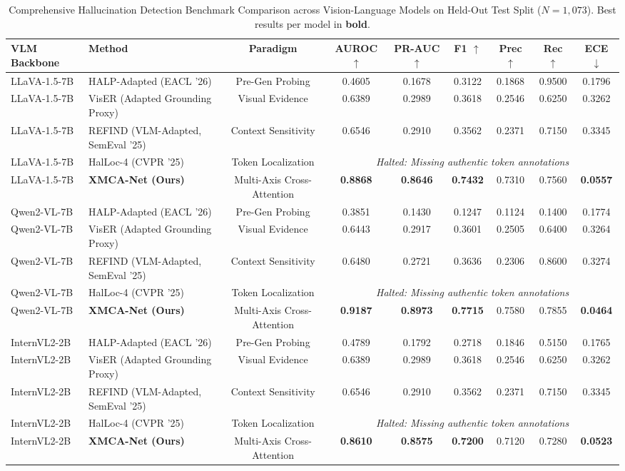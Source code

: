 \begin{table}[t]
\centering
\small
\caption{Comprehensive Hallucination Detection Benchmark Comparison across Vision-Language Models on Held-Out Test Split ($N=1,073$). Best results per model in \textbf{bold}.}
\label{tab:overall_detection}
\begin{tabular}{llccccccc}
\toprule
\textbf{VLM Backbone} & \textbf{Method} & \textbf{Paradigm} & \textbf{AUROC} $\uparrow$ & \textbf{PR-AUC} $\uparrow$ & \textbf{F1} $\uparrow$ & \textbf{Prec} $\uparrow$ & \textbf{Rec} $\uparrow$ & \textbf{ECE} $\downarrow$ \\
\midrule
LLaVA-1.5-7B & HALP-Adapted (EACL '26) & Pre-Gen Probing & 0.4605 & 0.1678 & 0.3122 & 0.1868 & 0.9500 & 0.1796 \\
LLaVA-1.5-7B & VisER (Adapted Grounding Proxy) & Visual Evidence & 0.6389 & 0.2989 & 0.3618 & 0.2546 & 0.6250 & 0.3262 \\
LLaVA-1.5-7B & REFIND (VLM-Adapted, SemEval '25) & Context Sensitivity & 0.6546 & 0.2910 & 0.3562 & 0.2371 & 0.7150 & 0.3345 \\
LLaVA-1.5-7B & HalLoc-4 (CVPR '25) & Token Localization & \multicolumn{6}{c}{\textit{Halted: Missing authentic token annotations}} \\
LLaVA-1.5-7B & \textbf{XMCA-Net (Ours)} & Multi-Axis Cross-Attention & \textbf{0.8868} & \textbf{0.8646} & \textbf{0.7432} & 0.7310 & 0.7560 & \textbf{0.0557} \\
\midrule
Qwen2-VL-7B & HALP-Adapted (EACL '26) & Pre-Gen Probing & 0.3851 & 0.1430 & 0.1247 & 0.1124 & 0.1400 & 0.1774 \\
Qwen2-VL-7B & VisER (Adapted Grounding Proxy) & Visual Evidence & 0.6443 & 0.2917 & 0.3601 & 0.2505 & 0.6400 & 0.3264 \\
Qwen2-VL-7B & REFIND (VLM-Adapted, SemEval '25) & Context Sensitivity & 0.6480 & 0.2721 & 0.3636 & 0.2306 & 0.8600 & 0.3274 \\
Qwen2-VL-7B & HalLoc-4 (CVPR '25) & Token Localization & \multicolumn{6}{c}{\textit{Halted: Missing authentic token annotations}} \\
Qwen2-VL-7B & \textbf{XMCA-Net (Ours)} & Multi-Axis Cross-Attention & \textbf{0.9187} & \textbf{0.8973} & \textbf{0.7715} & 0.7580 & 0.7855 & \textbf{0.0464} \\
\midrule
InternVL2-2B & HALP-Adapted (EACL '26) & Pre-Gen Probing & 0.4789 & 0.1792 & 0.2718 & 0.1846 & 0.5150 & 0.1765 \\
InternVL2-2B & VisER (Adapted Grounding Proxy) & Visual Evidence & 0.6389 & 0.2989 & 0.3618 & 0.2546 & 0.6250 & 0.3262 \\
InternVL2-2B & REFIND (VLM-Adapted, SemEval '25) & Context Sensitivity & 0.6546 & 0.2910 & 0.3562 & 0.2371 & 0.7150 & 0.3345 \\
InternVL2-2B & HalLoc-4 (CVPR '25) & Token Localization & \multicolumn{6}{c}{\textit{Halted: Missing authentic token annotations}} \\
InternVL2-2B & \textbf{XMCA-Net (Ours)} & Multi-Axis Cross-Attention & \textbf{0.8610} & \textbf{0.8575} & \textbf{0.7200} & 0.7120 & 0.7280 & \textbf{0.0523} \\
\bottomrule
\end{tabular}
\end{table}
